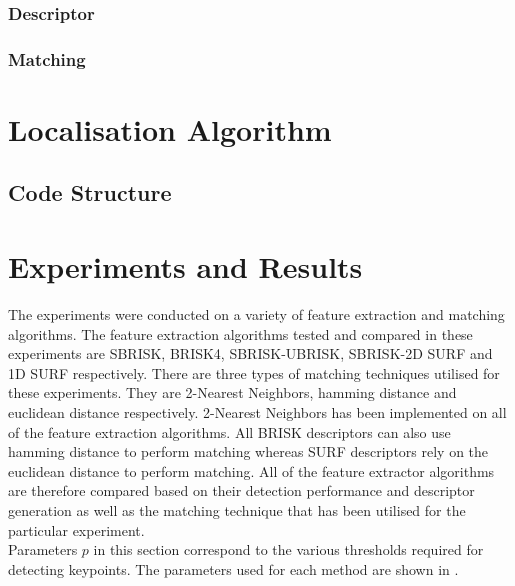 \documentclass{article}
\begin{document}
\subsubsection{Descriptor}
\label{sec:brisk2dsurfDescribe}

\subsubsection{Matching}
\label{sec:1dsurfMatching}

\section{Localisation Algorithm}
\label{sec:localisation}

\subsection{Code Structure}
\label{sec:codeStructure}

\section{Experiments and Results}
\label{sec:experimentsResults}
The experiments were conducted on a variety of feature extraction and matching algorithms. The feature extraction algorithms tested and compared in these experiments are SBRISK, BRISK4, SBRISK-UBRISK, SBRISK-2D SURF and 1D SURF respectively. There are three types of matching techniques utilised for these experiments. They are 2-Nearest Neighbors, hamming distance and euclidean distance respectively. 2-Nearest Neighbors has been implemented on all of the feature extraction algorithms. All BRISK descriptors can also use hamming distance to perform matching whereas SURF descriptors rely on the euclidean distance to perform matching. All of the feature extractor algorithms are therefore compared based on their detection performance and descriptor generation as well as the matching technique that has been utilised for the particular experiment.\\

Parameters $p$ in this section correspond to the various thresholds required for detecting keypoints. The parameters used for each method are shown in .\\
\end{document}
